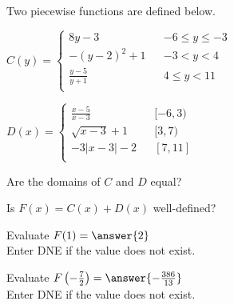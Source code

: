 \documentclass{ximera}
\begin{document}
\begin{definition}
Two piecewise functions are defined below.

$C(y) =   
\left \{ \begin{aligned}     
8 y - 3 && -6 \leq y \leq -3 \\        
-(y-2)^2 + 1 && -3 < y < 4 \\      
\frac{y-5}{y+1} && 4 \leq y < 11\\       
\end{aligned} \right .$ 




$D(x) =   
\left \{ \begin{aligned}     
\frac{x-5}{x-3} && [-6, 3) \\        
\sqrt{x-3} + 1 && [3, 7) \\      
-3|x-3|-2 && [7, 11]\\       
\end{aligned} \right .$ 


\end{definition}





\begin{exercise}
Are the domains of $C$ and $D$ equal?

\begin{multipleChoice}
\end{multipleChoice}

\end{exercise}


\begin{exercise}
Is $F(x) = C(x) + D(x)$ well-defined?

\begin{multipleChoice}
\end{multipleChoice}

\end{exercise}





\begin{exercise}

Evaluate $F(1) = \answer{2}$ \\
Enter DNE if the value does not exist.

\end{exercise}




\begin{exercise}

Evaluate $F\left(-\frac{7}{2}\right) = \answer{-\frac{386}{13}}$ \\
Enter DNE if the value does not exist.

\end{exercise}
\end{document}
